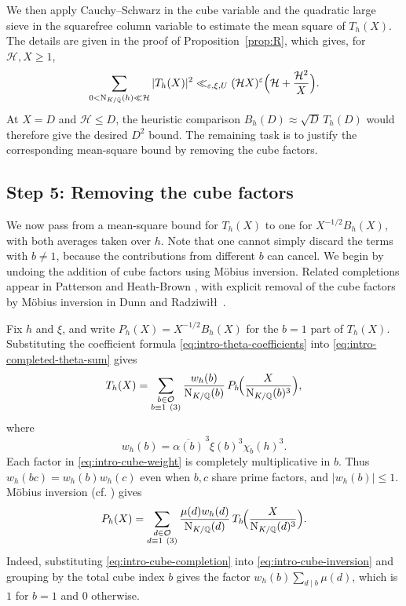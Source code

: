 \documentclass[11pt,a4paper]{article}
\numberwithin{equation}{section}
\numberwithin{figure}{section}
\theoremstyle{definition}
\theoremstyle{remark}
\newcommand{\Q}{\mathbb Q}
\newcommand{\NK}{\mathrm N_{K/\Q}}
\newcommand{\OO}{\mathcal O}
\begin{document}
We then apply Cauchy--Schwarz in the cube variable and the quadratic
large sieve in the squarefree column variable to estimate the mean square of $T_h(X)$. The details are given in the proof of Proposition~\ref{prop:R}, which gives, for $\mathcal H,X\ge1$,
\begin{equation}\label{eq:intro-completed-ms}
 \sum_{0<\NK(h)\ll\mathcal H}|T_h(X)|^2
 \ll_{\varepsilon,\xi,U}(\mathcal H X)^\varepsilon
       \Bigl(\mathcal H+\frac{\mathcal H^2}{X}\Bigr).
\end{equation}
At $X=D$ and $\mathcal H\le D$, the heuristic comparison
$B_h(D)\approx\sqrt D\,T_h(D)$ would therefore give the desired
$D^2$ bound. The remaining task is to justify the corresponding
mean-square bound by removing the cube factors.

\subsection{Step 5: Removing the cube factors} 
We now pass from a mean-square bound for $T_h(X)$ to one for $X^{-1/2}B_h(X)$, with both averages taken over $h$. Note that one cannot simply discard the terms with $b\ne1$, because the contributions from different $b$ can cancel. We begin by undoing the addition of cube factors using M\"obius inversion. Related completions appear in Patterson \cite[Theorem~6.1]{Pat77} and Heath-Brown \cite[\S3]{HB00}, with explicit removal of the cube factors by M\"obius inversion in Dunn and Radziwi\l\l\ \cite[Proposition~5.3 and (8.2)]{DR}.

Fix $h$ and $\xi$, and write $P_h(X)=X^{-1/2}B_h(X)$ for the $b=1$ part of $T_h(X)$. Substituting the coefficient formula \eqref{eq:intro-theta-coefficients} into \eqref{eq:intro-completed-theta-sum} gives
\begin{equation}\label{eq:intro-cube-completion}
 T_h(X)=\sum_{\substack{b\in\OO\\b\equiv1\ (3)}}\frac{w_h(b)}{\NK(b)}\,
                  P_h\!\Bigl(\frac{X}{\NK(b)^3}\Bigr),
\end{equation}
where
\begin{equation}\label{eq:intro-cube-weight}
 w_h(b)=\overline{\alpha(b)}^{\,3}\xi(b)^3\chi_b(h)^3.
\end{equation}
Each factor in \eqref{eq:intro-cube-weight} is completely multiplicative in $b$. Thus $w_h(bc)=w_h(b)w_h(c)$ even when $b,c$ share prime factors, and $|w_h(b)|\le1$. M\"obius inversion (cf. \cite[\S1.3]{IK04}) gives
\begin{equation}\label{eq:intro-cube-inversion}
 P_h(X)=\sum_{\substack{d\in\OO\\d\equiv1\ (3)}}\frac{\mu(d)w_h(d)}{\NK(d)}\,
                  T_h\!\Bigl(\frac{X}{\NK(d)^3}\Bigr).
\end{equation}
Indeed, substituting \eqref{eq:intro-cube-completion} into \eqref{eq:intro-cube-inversion} and grouping by the total cube index $b$ gives the factor $w_h(b)\sum_{d\mid b}\mu(d)$, which is $1$ for $b=1$ and $0$ otherwise.
\end{document}
